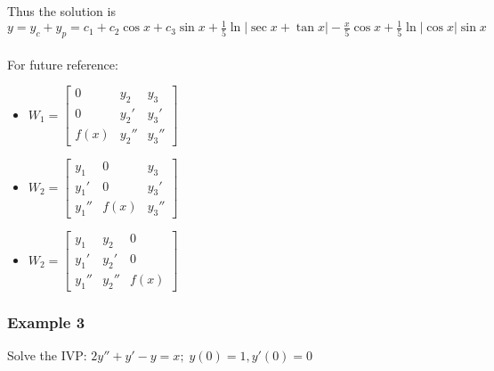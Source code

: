 \documentclass{article}
\newcommand{\mathree}[9]{\begin{bmatrix} #1 & #2 & #3 \\ #4 & #5 & #6 \\ #7 & #8 & #9 \end{bmatrix}}
\begin{document}
\\\\Thus the solution is $y=y_c+y_p=c_1+c_2\cos x+c_3\sin x+\frac{1}{5}\ln|\sec x+\tan x|-\frac{x}{5}\cos x+\frac{1}{5}\ln|\cos x|\sin x$
\\\\For future reference:\begin{itemize}
    \itemsep 0em
    \item $W_1=\mathree{0}{y_2}{y_3}{0}{y_2'}{y_3'}{f(x)}{y_2''}{y_3''}$
    \item $W_2=\mathree{y_1}{0}{y_3}{y_1'}{0}{y_3'}{y_1''}{f(x)}{y_3''}$
    \item $W_2=\mathree{y_1}{y_2}{0}{y_1'}{y_2'}{0}{y_1''}{y_2''}{f(x)}$
\end{itemize}

\subsubsection{Example 3}
Solve the IVP: $2y''+y'-y=x;\;y(0)=1,y'(0)=0$
\end{document}
